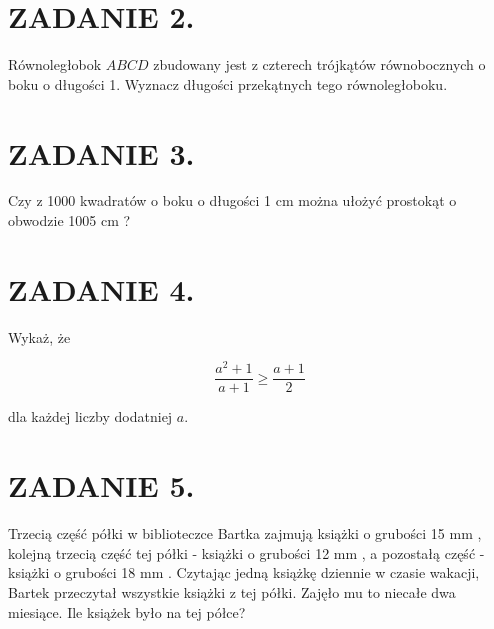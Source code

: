 \documentclass[10pt]{article}
\begin{document}
\section*{ZADANIE 2.}
Równoległobok \(A B C D\) zbudowany jest z czterech trójkątów równobocznych o boku o długości 1. Wyznacz długości przekątnych tego równoległoboku.

\section*{ZADANIE 3.}
Czy z 1000 kwadratów o boku o długości 1 cm można ułożyć prostokąt o obwodzie 1005 cm ?

\section*{ZADANIE 4.}
Wykaż, że

\[
\frac{a^{2}+1}{a+1} \geqslant \frac{a+1}{2}
\]

dla każdej liczby dodatniej \(a\).

\section*{ZADANIE 5.}
Trzecią część półki w biblioteczce Bartka zajmują książki o grubości 15 mm , kolejną trzecią część tej półki - książki o grubości 12 mm , a pozostałą część - książki o grubości 18 mm . Czytając jedną książkę dziennie w czasie wakacji, Bartek przeczytał wszystkie książki z tej półki. Zajęło mu to niecałe dwa miesiące. Ile książek było na tej półce?
\end{document}
